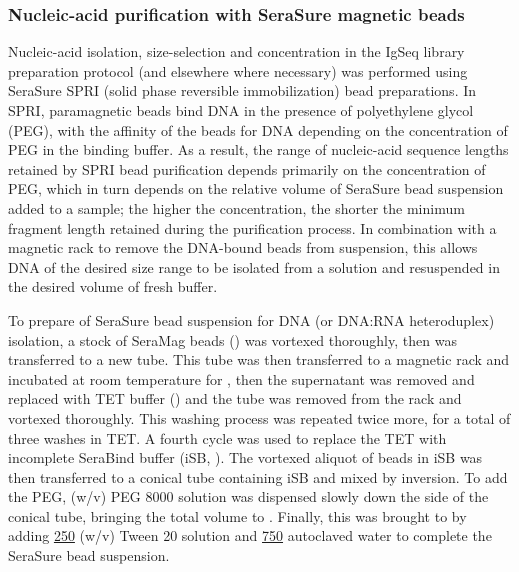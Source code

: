 \subsubsection{Nucleic-acid purification with SeraSure magnetic beads}
\label{sec:methods_molec_standard_serasure}

Nucleic-acid isolation, size-selection and concentration in the IgSeq library preparation protocol (and elsewhere where necessary) was performed using SeraSure SPRI (solid phase reversible immobilization) bead preparations. In SPRI, paramagnetic beads bind DNA in the presence of polyethylene glycol (PEG), with the affinity of the beads for DNA depending on the concentration of PEG in the binding buffer. As a result, the range of nucleic-acid sequence lengths retained by SPRI bead purification depends primarily on the concentration of PEG, which in turn depends on the relative volume of SeraSure bead suspension added to a sample; the higher the concentration, the shorter the minimum fragment length retained during the purification process. In combination with a magnetic rack to remove the DNA-bound beads from suspension, this allows DNA of the desired size range to be isolated from a solution and resuspended in the desired volume of fresh buffer.

To prepare  of SeraSure bead suspension for DNA (or DNA:RNA heteroduplex) isolation, a stock of SeraMag beads () was vortexed thoroughly, then  was transferred to a new tube. This tube was then transferred to a magnetic rack and incubated at room temperature for , then the supernatant was removed and replaced with  TET buffer () and the tube was removed from the rack and vortexed thoroughly. This washing process was repeated twice more, for a total of three washes in TET. A fourth cycle was used to replace the TET with incomplete SeraBind buffer (iSB, ). The vortexed  aliquot of beads in iSB was then transferred to a conical tube containing  iSB and mixed by inversion. To add the PEG,   (w/v) PEG 8000 solution was dispensed slowly down the side of the conical tube, bringing the total volume to . Finally, this was brought to  by adding \ul{250}  (w/v) Tween 20 solution and \ul{750} autoclaved water to complete the SeraSure bead suspension.

